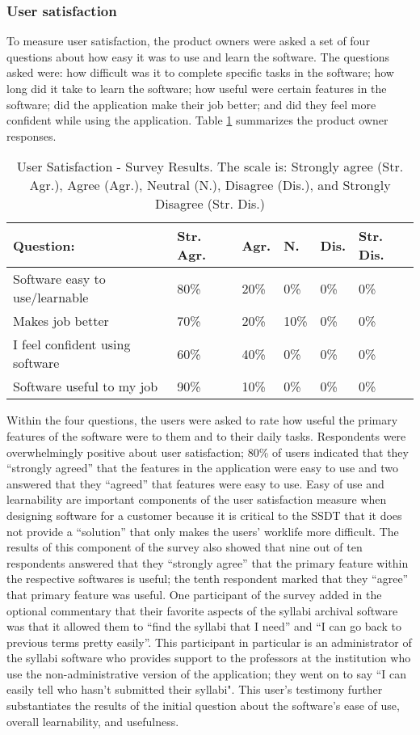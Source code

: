 \subsubsection{User satisfaction}
To measure user satisfaction, the product owners were asked a set of four questions about how easy it was to use and learn the software. The questions asked were: how difficult was it to complete specific tasks in the software; how long did it take to learn the software; how useful were certain features in the software; did the application make their job better; and did they feel more confident while using the application. Table \ref{table:usersatisfaction} summarizes the product owner responses.

\begin{table}
\caption{User Satisfaction - Survey Results. The scale is: Strongly agree (Str. Agr.), Agree (Agr.), Neutral (N.), Disagree (Dis.), and Strongly Disagree (Str. Dis.)}
\label{table:usersatisfaction}
\begin{tabular}{p{2.6cm}p{.75cm}p{.75cm}p{.75cm}p{.75cm}p{.75cm}}
Question: & Str. Agr. & Agr. & N. & Dis. & Str. Dis. \\
 \hline
Software easy to use/learnable & 80\% & 20\% & 0\% & 0\% & 0\% \\
Makes job better & 70\% & 20\% & 10\% & 0\% & 0\% \\
I feel confident using software & 60\% & 40\% & 0\% & 0\% & 0\% \\
Software useful to my job & 90\% & 10\% & 0\% & 0\% & 0\% \\
\end{tabular}
\end{table}

Within the four questions, the users were asked to rate how useful the primary features of the software were to them and to their daily tasks. Respondents were overwhelmingly positive about user satisfaction; 80\% of users indicated that they ``strongly agreed'' that the features in the application were easy to use and two answered that they ``agreed'' that features were easy to use. Easy of use and learnability are important components of the user satisfaction measure when designing software for a customer because it is critical to the SSDT that it does not provide a ``solution'' that only makes the users' worklife more difficult. The results of this component of the survey also showed that nine out of ten respondents answered that they ``strongly agree'' that the primary feature within the respective softwares is useful; the tenth respondent marked that they ``agree'' that  primary feature was useful. One participant of the survey added in the optional commentary that their favorite aspects of the syllabi archival software was that it allowed them to  ``find the syllabi that I need'' and ``I can go back to previous terms pretty easily''. This participant in particular is an administrator of the syllabi software who provides support to the professors at the institution who use the non-administrative version of the application; they went on to say ``I can easily tell who hasn't submitted their syllabi". This user's testimony further substantiates the results of the initial question about the software's ease of use, overall learnability, and usefulness.

